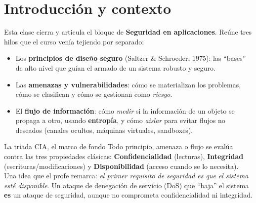 \documentclass[11pt,a4paper]{article}
\begin{document}
\tableofcontents
\newpage

\section{Introducción y contexto}

Esta clase cierra y articula el bloque de \textbf{Seguridad en aplicaciones}. Reúne tres
hilos que el curso venía tejiendo por separado:

\begin{itemize}[leftmargin=1.4em,itemsep=2pt]
  \item Los \textbf{principios de diseño seguro} (Saltzer \& Schroeder, 1975): las ``bases''
        de alto nivel que guían el armado de un sistema robusto y seguro.
  \item Las \textbf{amenazas y vulnerabilidades}: cómo se materializan los problemas, cómo
        se clasifican y cómo se gestionan como \emph{riesgo}.
  \item El \textbf{flujo de información}: cómo \emph{medir} si la información de un objeto se
        propaga a otro, usando \textbf{entropía}, y cómo \emph{aislar} para evitar flujos no
        deseados (canales ocultos, máquinas virtuales, sandboxes).
\end{itemize}

\begin{defbox}{La tríada CIA, el marco de fondo}
Todo principio, amenaza o flujo se evalúa contra las tres propiedades clásicas:
\textbf{Confidencialidad} (lecturas), \textbf{Integridad} (escrituras/modificaciones) y
\textbf{Disponibilidad} (acceso cuando se lo necesita). Una idea que el profe remarca: \emph{el
primer requisito de seguridad es que el sistema esté disponible}. Un ataque de
denegación de servicio (DoS) que ``baja'' el sistema \textbf{es} un ataque de seguridad, aunque
no comprometa confidencialidad ni integridad.
\end{defbox}
\end{document}

